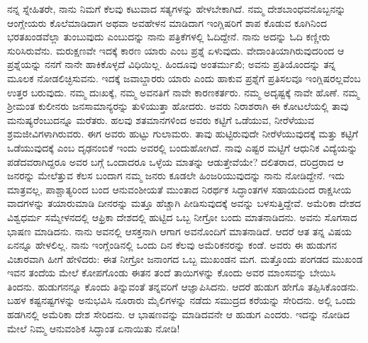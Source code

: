 ನನ್ನ ಸ್ನೇಹಿತರೇ, ನಾನು ನಿಮಗೆ ಕೆಲವು ಕಟುವಾದ ಸತ್ಯಗಳನ್ನು ಹೇಳಬೇಕಾಗಿದೆ. ನಮ್ಮ ದೇಶಬಾಂಧವನೊಬ್ಬನನ್ನು ಆಂಗ್ಲೇಯರು ಕೊಲೆಮಾಡಿದಾಗ ಅಥವಾ ಅವಹೇಳನ ಮಾಡಿದಾಗ ಇಂಗ್ಲಿಷರಿಗೆ ಶಾಪ ಕೊಡುವ ಕೂಗಿನಿಂದ ಭರತಖಂಡವೆಲ್ಲಾ ತುಂಬುವುದು ಎಂಬುದನ್ನು ನಾನು ಪತ್ರಿಕೆಗಳಲ್ಲಿ ಓದಿದ್ದೇನೆ. ನಾನು ಅದನ್ನು ಓದಿ ಕಣ್ಣೀರು ಸುರಿಸಿರು\-ವೆನು. ಮರುಕ್ಷಣವೇ ಇದಕ್ಕೆ ಕಾರಣ ಯಾರು ಎಂಬ ಪ್ರಶ್ನೆ ಏಳುವುದು. ವೇದಾಂತಿಯಾಗಿರುವುದರಿಂದ ಆ ಪ್ರಶ್ನೆಯನ್ನು ನನಗೆ ನಾನೇ ಹಾಕಿಕೊಳ್ಳದೆ ವಿಧಿಯಿಲ್ಲ. ಹಿಂದೂವು ಅಂತರ್ಮುಖಿ; ಅವನು ಪ್ರತಿಯೊಂದನ್ನು ತನ್ನ ಮೂಲಕ ನೋಡಲಿಚ್ಛಿಸುವನು. ಇದಕ್ಕೆ ಜವಾಬ್ದಾರರು ಯಾರು ಎಂದು ಹಾಕುವ ಪ್ರಶ್ನೆಗೆ ಪ್ರತಿಸಲವೂ ಇಂಗ್ಲಿಷರಲ್ಲವೆಂಬ ಉತ್ತರ ಬರುವುದು. ನಮ್ಮ ದುಃಖಕ್ಕೆ, ನಮ್ಮ ಅವನತಿಗೆ ನಾವೇ ಕಾರಣಕರ್ತರು. ನಮ್ಮ ಅದೃಷ್ಟಕ್ಕೆ ನಾವೇ ಹೊಣೆ. ನಮ್ಮ ಶ‍್ರೀಮಂತ ಕುಲೀನರು ಜನಸಾಮಾನ್ಯರನ್ನು ತುಳಿಯುತ್ತಾ ಹೋದರು. ಅವರು ನಿರಾಶರಾಗಿ ಈ ಕೋಟಲೆಯಲ್ಲಿ ತಾವು ಮನುಷ್ಯರೆಂಬುದನ್ನೂ ಮರೆತರು. ಹಲವು ಶತಮಾನಗಳಿಂದ ಅವರು ಕಟ್ಟಿಗೆ ಒಡೆಯುವ, ನೀರೆಳೆಯುವ ಶ್ರಮಜೀವಿಗಳಾಗಿರುವರು. ಈಗ ಅವರು ಹುಟ್ಟು ಗುಲಾಮರು. ತಾವು ಹುಟ್ಟಿರುವುದೇ ನೀರೆಳೆಯುವುದಕ್ಕೆ ಮತ್ತು ಕಟ್ಟಿಗೆ ಒಡೆಯುವುದಕ್ಕೆ ಎಂಬ ದೃಢನಂಬಿಕೆ ಇಂದು ಅವರಲ್ಲಿ ಬಂದುಹೋಗಿದೆ. ನಾವು ಎಷ್ಟರ ಮಟ್ಟಿಗೆ ಆಧುನಿಕ ವಿದ್ಯೆಯನ್ನು ಪಡೆದವರಾಗಿದ್ದರೂ ಅವರ ಬಗ್ಗೆ ಒಂದಾದರೂ ಒಳ್ಳೆಯ ಮಾತನ್ನು ಆಡುತ್ತೇವೆಯೇ? ದಲಿತರಾದ, ದರಿದ್ರರಾದ ಆ ಜನರನ್ನು ಮೇಲೆತ್ತುವ ಕೆಲಸ ಬಂದಾಗ ನಮ್ಮ ಜನರು ಕೂಡಲೇ ಹಿಂಜರಿಯುವುದನ್ನು ನಾನು ನೋಡಿದ್ದೇನೆ. ಇದು ಮಾತ್ರವಲ್ಲ, ಪಾಶ್ಚಾತ್ಯರಿಂದ ಬಂದ ಆನುವಂಶೀಯತೆ ಮುಂತಾದ ನಿರರ್ಥಕ ಸಿದ್ಧಾಂತಗಳ ಸಹಾಯದಿಂದ ರಾಕ್ಷಸೀಯ ವಾದಗಳನ್ನು ತಯಾರುಮಾಡಿ ದೀನರನ್ನು ಮತ್ತೂ ಹೆಚ್ಚಾಗಿ ಪೀಡಿಸುವುದಕ್ಕೆ ಅವನ್ನು ಬಳಸುತ್ತಿದ್ದೇವೆ. ಅಮೆರಿಕಾ ದೇಶದ ವಿಶ್ವಧರ್ಮ ಸಮ್ಮೇಳನದಲ್ಲಿ ಆಫ್ರಿಕಾ ದೇಶದಲ್ಲಿ ಹುಟ್ಟಿದ ಒಬ್ಬ ನೀಗ್ರೋ ಬಂದು ಮಾತನಾಡಿದನು. ಅವನು ಸೊಗಸಾದ ಭಾಷಣ ಮಾಡಿದನು. ನಾನು ಅವನಲ್ಲಿ ಆಸಕ್ತನಾಗಿ ಆಗಾಗ ಅವನೊಂದಿಗೆ ಮಾತನಾಡಿದೆ. ಆದರೆ ಆತ ತನ್ನ ವಿಷಯ ಏನನ್ನೂ ಹೇಳಲಿಲ್ಲ. ನಾನು ಇಂಗ್ಲೆಂಡಿನಲ್ಲಿ ಒಂದು ದಿನ ಕೆಲವು ಅಮೆರಿಕನರನ್ನು ಕಂಡೆ. ಅವರು ಈ ಹುಡುಗನ ವಿಚಾರವಾಗಿ ಹೀಗೆ ಹೇಳಿದರು: ಈತ ನೀಗ್ರೋ ಜನಾಂಗದ ಒಬ್ಬ ಮುಖಂಡನ ಮಗ. ಮತ್ತೊಂದು ಪಂಗಡದ ಮುಖಂಡ ಇವನ ತಂದೆಯ ಮೇಲೆ ಕೋಪಗೊಂಡು ಈತನ ತಂದೆ ತಾಯಿಗಳನ್ನು ಕೊಂದು ಅವರ ಮಾಂಸವನ್ನು ಬೇಯಿಸಿ ತಿಂದನು. ಹುಡುಗನನ್ನೂ ಕೊಂದು ತಿನ್ನುವಂತೆ ತನ್ನವರಿಗೆ ಆಜ್ಞಾಪಿಸಿದನು. ಆದರೆ ಹುಡುಗ ಹೇಗೊ ತಪ್ಪಿಸಿಕೊಂಡನು. ಬಹಳ ಕಷ್ಟನಷ್ಟಗಳನ್ನು ಅನುಭವಿಸಿ ನೂರಾರು ಮೈಲಿಗಳನ್ನು ನಡೆದು ಸಮುದ್ರದ ಕರೆಯನ್ನು ಸೇರಿದನು. ಅಲ್ಲಿ ಒಂದು ಹಡಗಿನಲ್ಲಿ ಅಮೆರಿಕಾ ದೇಶ ಸೇರಿದನು. ಆ ಭಾಷಣವನ್ನು ಮಾಡಿದವನೇ ಆ ಹುಡುಗ ಎಂದರು. ಇದನ್ನು ನೋಡಿದ ಮೇಲೆ ನಿಮ್ಮ ಆನುವಂಶಿಕ ಸಿದ್ಧಾಂತ ಏನಾಯಿತು ನೋಡಿ!

